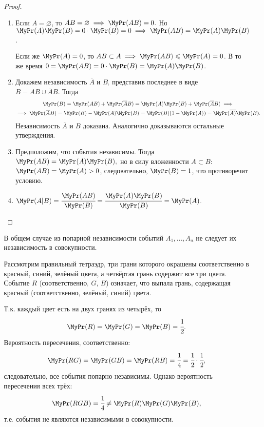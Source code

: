 \begin{proof}
	\begin{enumerate} 
		\item 
		      Если $A = \varnothing$, то $AB = \varnothing \implies \MyPr(AB) = 0.$ Но $ \MyPr(A)\MyPr(B) = 0 \cdot \MyPr(B) = 0 \implies \MyPr(AB) = \MyPr(A) \MyPr(B)$.
		              
		      Если же ${\MyPr(A) = 0}$, то ${AB \subset A \implies \MyPr(AB) \leqslant \MyPr(A) = 0}$. 
		      В то же время ${0 = \MyPr(AB) = 0 \cdot \MyPr(B) = \MyPr(A) \MyPr(B)}$.
		\item 
		      Докажем независимость $\overline{A}$ и $B$, представив последнее в виде \\
		      $B = AB \cup \overline{A}B$. Тогда
		      \begin{multline*}
		      	\MyPr(B) = \MyPr(AB) + \MyPr(\overline{A}B) = \MyPr(A)\MyPr(B) + \MyPr(\overline{A}B) \implies \\
		      	\implies \MyPr(\overline{A}B) = \MyPr(B) - \MyPr(A)\MyPr(B) = \MyPr(B) (1 - \MyPr(A)) = \MyPr(\overline{A)}\MyPr(B).
		      \end{multline*}
		      Независимость $\overline{A}$ и $B$ доказана. 
		      Аналогично доказываются остальные утверждения.
		\item 
		      Предположим, что события независимы. 
		      Тогда $\MyPr(AB) = \MyPr(A)\MyPr(B),$ но в силу вложенности $A \subset B$: $\MyPr(AB) = \MyPr(A) > 0$, следовательно, $\MyPr(B) = 1$, что противоречит условию.
		\item 
		      $\MyPr(A | B) = \cfrac{\MyPr(AB)}{\MyPr(B)} = \cfrac{\MyPr(A)\MyPr(B)}{\MyPr(B)} = \MyPr(A)$.
	\end{enumerate}
\end{proof}

\begin{rmrk}
	В общем случае из попарной независимости событий $A_1, \ldots, A_n$ не следует их независимость в совокупности.
	\begin{exmp}
		Рассмотрим правильный тетраэдр, три грани которого окрашены соответственно в красный, синий, зелёный цвета, а четвёртая грань содержит все три цвета. 
		Событие $R$ (соответственно, $G$, $B$) означает, что выпала грань, содержащая красный (соответственно, зелёный, синий) цвета.
		
		Т.к. каждый цвет есть на двух гранях из четырёх, то
		\begin{equation*}
			\MyPr(R) = \MyPr(G) = \MyPr(B) = \cfrac{1}{2}.
		\end{equation*}
		Вероятность пересечения, соответственно:
		\begin{equation*}
			\MyPr(RG) = \MyPr(GB) = \MyPr(RB) = \cfrac{1}{4} = \cfrac{1}{2} \cdot \cfrac{1}{2},
		\end{equation*}
		следовательно, все события попарно независимы. 
		Однако вероятность пересечения всех трёх:
		\begin{equation*}
			\MyPr(RGB)  = \cfrac{1}{4} \neq \MyPr(R) \MyPr(G) \MyPr(B),
		\end{equation*}
		т.е. события не являются независимыми в совокупности. 
	\end{exmp}
\end{rmrk}

